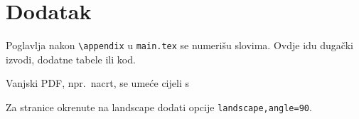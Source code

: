 \chapter{Dodatak}
\label{ch:dodatak}

Poglavlja nakon \verb+\appendix+ u \texttt{main.tex} se numerišu slovima.
Ovdje idu dugački izvodi, dodatne tabele ili kod.

Vanjski PDF, npr.~nacrt, se umeće cijeli s
\begin{center}
	\verb++
\end{center}
Za stranice okrenute na landscape dodati opcije \verb+landscape,angle=90+.

